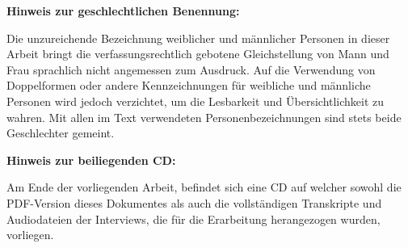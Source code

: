 \vspace*{\fill}

\begin{flushleft}
\textbf{Hinweis zur geschlechtlichen Benennung:}
\end{flushleft}
Die unzureichende Bezeichnung weiblicher und männlicher Personen in dieser Arbeit bringt die verfassungsrechtlich gebotene Gleichstellung von Mann und Frau sprachlich nicht angemessen zum Ausdruck. Auf die Verwendung von Doppelformen oder andere Kennzeichnungen für weibliche und männliche Personen wird jedoch verzichtet, um die Lesbarkeit und Übersichtlichkeit zu wahren. Mit allen im Text verwendeten Personenbezeichnungen sind stets beide Geschlechter gemeint.

\begin{flushleft}
\textbf{Hinweis zur beiliegenden CD:}
\end{flushleft}
Am Ende der vorliegenden Arbeit, befindet sich eine CD auf welcher sowohl die PDF-Version dieses Dokumentes als auch die vollständigen Transkripte und Audiodateien der Interviews, die für die Erarbeitung herangezogen wurden, vorliegen.